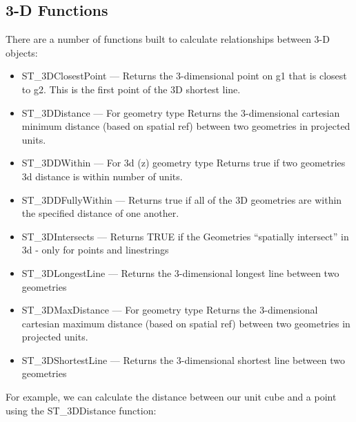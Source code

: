 \documentclass[a4paper,11pt,english]{sphinxmanual}
\begin{document}
\subsection{3-D Functions}
\label{\detokenize{advanced:d-functions}}
There are a number of functions built to calculate relationships between 3-D objects:
\begin{itemize}
\item {} 
ST\_3DClosestPoint — Returns the 3-dimensional point on g1 that is closest to g2. This is the first point of the 3D shortest line.

\item {} 
ST\_3DDistance — For geometry type Returns the 3-dimensional cartesian minimum distance (based on spatial ref) between two geometries in projected units.

\item {} 
ST\_3DDWithin — For 3d (z) geometry type Returns true if two geometries 3d distance is within number of units.

\item {} 
ST\_3DDFullyWithin — Returns true if all of the 3D geometries are within the specified distance of one another.

\item {} 
ST\_3DIntersects — Returns TRUE if the Geometries “spatially intersect” in 3d - only for points and linestrings

\item {} 
ST\_3DLongestLine — Returns the 3-dimensional longest line between two geometries

\item {} 
ST\_3DMaxDistance — For geometry type Returns the 3-dimensional cartesian maximum distance (based on spatial ref) between two geometries in projected units.

\item {} 
ST\_3DShortestLine — Returns the 3-dimensional shortest line between two geometries

\end{itemize}

For example, we can calculate the distance between our unit cube and a point using the ST\_3DDistance function:
\end{document}
